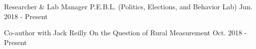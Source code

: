 

\begin{cventries}

    \cventry
      {Researcher \& Lab Manager} %
      {P.E.B.L. (Politics, Elections, and Behavior Lab)} %
      {Jun. 2018 - Present} %
      {} %
      {}


    \cventry
      {Co-author with Jack Reilly} %
      {On the Question of Rural Measurement} %
      {Oct. 2018 - Present} %
      {} %
      {}




\end{cventries}
